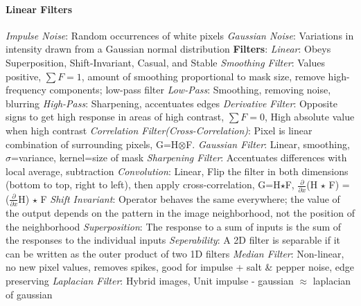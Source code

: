 \documentclass{article}
\author{Ian Chen}
\date{\today}
\begin{document}
    \begin{multicols*}{2}
        \paragraph*{Linear Filters}
        \textit{Impulse Noise}: Random occurrences of white pixels\newline
        \textit{Gaussian Noise}: Variations in intensity drawn from a Gaussian normal distribution\newline
        \textbf{Filters}:\newline
        \textit{Linear}: Obeys Superposition, Shift-Invariant, Casual, and Stable\newline
        \textit{Smoothing Filter}: Values positive, $\sum F=1$, amount of smoothing proportional to mask size, remove
        high-frequency components; low-pass filter\newline
        \textit{Low-Pass}: Smoothing, removing noise, blurring\newline
        \textit{High-Pass}: Sharpening, accentuates edges\newline
        \textit{Derivative Filter}: Opposite signs to get high response in areas of high contrast, $\sum F=0$, High
        absolute value when high contrast\newline
        \textit{Correlation Filter(Cross-Correlation)}: Pixel is linear combination of surrounding pixels,
        G=H$\otimes$F.\newline
        \textit{Gaussian Filter}: Linear, smoothing, $\sigma$=variance, kernel=size of mask\newline
        \textit{Sharpening Filter}: Accentuates differences with local average, subtraction\newline
        \textit{Convolution}: Linear, Flip the filter in both dimensions (bottom to top, right to left), then apply
        cross-correlation, G=H$\star$F, $\frac{\partial}{\partial x}$(H $\star$ F) = ($\frac{\partial}{\partial x}$H) $\star$ F\newline
        \textit{Shift Invariant}: Operator behaves the same everywhere; the value of the output depends on the
        pattern in the image neighborhood, not the position of the neighborhood\newline
        \textit{Superposition}: The response to a sum of inputs is the sum of the responses to the individual inputs\newline
        \textit{Seperability}: A 2D filter is separable if it can be written as the outer product of two 1D filters\newline
        \textit{Median Filter}: Non-linear, no new pixel values, removes spikes, good for impulse + salt \& pepper
        noise, edge preserving\newline
        \textit{Laplacian Filter}: Hybrid images, Unit impulse - gaussian $\approx$ laplacian of gaussian

\end{multicols*}
\end{document}
